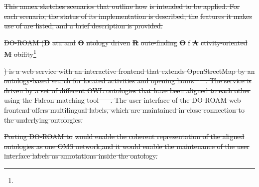 \documentclass[10pt,fleqn,final]{scrreprt}
\newcommand*{\DOL}{\ensuremath{\mathsf{DOL}}\xspace}
\newcommand{\informative}[0]{{\begin{center}{\Large{(Informative})}\end{center}} \bigskip}
\newcommand{\sclause}[1]{\section{#1}}
\newcommand{\infannex}[1]{ \chapter{Annex: #1}  \informative }
\providecommand{\DIFdel}[1]{{\protect\color{red}\sout{#1}}}                      %
\providecommand{\DIFdelbegin}{} %
\begin{document}
\DIFdelbegin %

\DIFdel{This annex sketches scenarios that outline how }%
\DIFdel{is intended to be applied.  For each scenario, the status of its implementation is described, the }%
\DIFdel{features it makes use of are listed, and a brief description is provided. }%

\DIFdel{DO-ROAM (}\textbf{\DIFdel{D}}%
\DIFdel{ata and }\textbf{\DIFdel{O}}%
\DIFdel{ntology driven }\textbf{\DIFdel{R}}%
\DIFdel{oute-finding }\textbf{\DIFdel{O}}%
\DIFdel{f }\textbf{\DIFdel{A}}%
\DIFdel{ctivity-oriented }\textbf{\DIFdel{M}}%
\DIFdel{obility}\footnote{%
}%
\addtocounter{footnote}{-1}%
\DIFdel{) is a web service with an interactive frontend that extends OpenStreetMap by an ontology-based search for located activities and opening hours \mbox{%
\cite{do-roam}
}%
. The service is driven by a set of different OWL ontologies that have been aligned to each other using the Falcon matching tool \mbox{%
\cite{HuQu-08}
}%
.  The user interface of the DO-ROAM web frontend offers multilingual labels, which are maintained in close connection to the underlying ontologies. }%

\DIFdel{Porting DO-ROAM to }%
\DIFdel{would enable the coherent representation of the aligned ontologies as one OMS network,and it would enable  the maintenance of the user interface labels as annotations inside the ontology. }%
\end{document}
